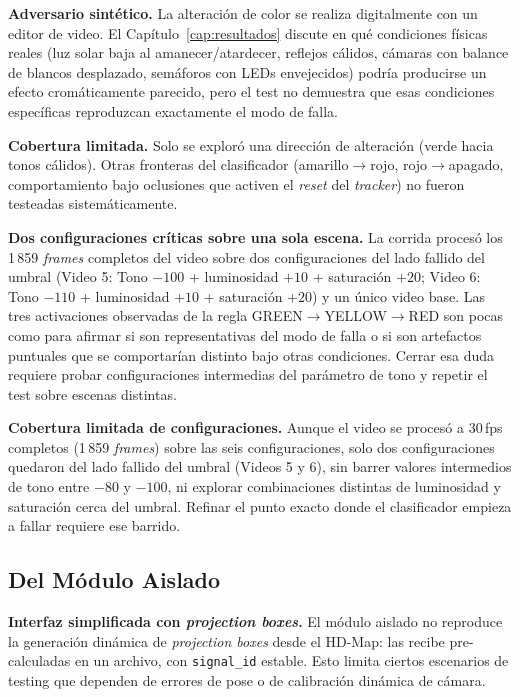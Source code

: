 \textbf{Adversario sintético.} La alteración de color se realiza digitalmente con un editor de video. El Capítulo~\ref{cap:resultados} discute en qué condiciones físicas reales (luz solar baja al amanecer/atardecer, reflejos cálidos, cámaras con balance de blancos desplazado, semáforos con LEDs envejecidos) podría producirse un efecto cromáticamente parecido, pero el test no demuestra que esas condiciones específicas reproduzcan exactamente el modo de falla.

\textbf{Cobertura limitada.} Solo se exploró una dirección de alteración (verde hacia tonos cálidos). Otras fronteras del clasificador (amarillo$\to$rojo, rojo$\to$apagado, comportamiento bajo oclusiones que activen el \textit{reset} del \textit{tracker}) no fueron testeadas sistemáticamente.

\textbf{Dos configuraciones críticas sobre una sola escena.} La corrida procesó los 1\,859 \textit{frames} completos del video sobre dos configuraciones del lado fallido del umbral (Video 5: Tono $-100$ + luminosidad $+10$ + saturación $+20$; Video 6: Tono $-110$ + luminosidad $+10$ + saturación $+20$) y un único video base. Las tres activaciones observadas de la regla GREEN$\to$YELLOW$\to$RED son pocas como para afirmar si son representativas del modo de falla o si son artefactos puntuales que se comportarían distinto bajo otras condiciones. Cerrar esa duda requiere probar configuraciones intermedias del parámetro de tono y repetir el test sobre escenas distintas.

\textbf{Cobertura limitada de configuraciones.} Aunque el video se procesó a 30\,fps completos (1\,859 \textit{frames}) sobre las seis configuraciones, solo dos configuraciones quedaron del lado fallido del umbral (Videos 5 y 6), sin barrer valores intermedios de tono entre $-80$ y $-100$, ni explorar combinaciones distintas de luminosidad y saturación cerca del umbral. Refinar el punto exacto donde el clasificador empieza a fallar requiere ese barrido.

\subsection{Del Módulo Aislado}

\textbf{Interfaz simplificada con \textit{projection boxes}.} El módulo aislado no reproduce la generación dinámica de \textit{projection boxes} desde el HD-Map: las recibe pre-calculadas en un archivo, con \texttt{signal\_id} estable. Esto limita ciertos escenarios de testing que dependen de errores de pose o de calibración dinámica de cámara.

